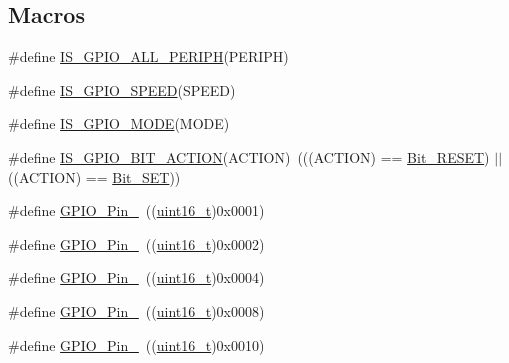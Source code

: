 \subsection*{Macros}
\begin{DoxyCompactItemize}
\item 
\#define \hyperlink{group___g_p_i_o___exported___types_ga68b2a1f0b05c13978217db5439c7f790}{I\+S\+\_\+\+G\+P\+I\+O\+\_\+\+A\+L\+L\+\_\+\+P\+E\+R\+I\+PH}(P\+E\+R\+I\+PH)
\item 
\#define \hyperlink{group___g_p_i_o___exported___types_ga888e1f951df2fe9dbf827528051a3a56}{I\+S\+\_\+\+G\+P\+I\+O\+\_\+\+S\+P\+E\+ED}(S\+P\+E\+ED)
\item 
\#define \hyperlink{group___g_p_i_o___exported___types_gacc5fde3eef57ec3c558c11d0011d900c}{I\+S\+\_\+\+G\+P\+I\+O\+\_\+\+M\+O\+DE}(M\+O\+DE)
\item 
\#define \hyperlink{group___g_p_i_o___exported___types_ga6b882caa8ed9857c5c7267959a7818c5}{I\+S\+\_\+\+G\+P\+I\+O\+\_\+\+B\+I\+T\+\_\+\+A\+C\+T\+I\+ON}(A\+C\+T\+I\+ON)~(((A\+C\+T\+I\+ON) == \hyperlink{group___g_p_i_o___exported___types_ga176130b21c0e719121470a6042d4cf19ae2c026f2b44a949f82a65f3385edef09}{Bit\+\_\+\+R\+E\+S\+ET}) $\vert$$\vert$ ((A\+C\+T\+I\+ON) == \hyperlink{group___g_p_i_o___exported___types_ga176130b21c0e719121470a6042d4cf19a3c477841a6ceec13fe47ef322432b992}{Bit\+\_\+\+S\+ET}))
\item 
\#define \hyperlink{group___g_p_i_o__pins__define_gab305b8d1be9f89bf2b4a05589b456049}{G\+P\+I\+O\+\_\+\+Pin\+\_}~((\hyperlink{_p_e___types_8h_a1f1825b69244eb3ad2c7165ddc99c956}{uint16\+\_\+t})0x0001)
\item 
\#define \hyperlink{group___g_p_i_o__pins__define_ga29db642c26f1fa0fffc3ecadcd30f82b}{G\+P\+I\+O\+\_\+\+Pin\+\_}~((\hyperlink{_p_e___types_8h_a1f1825b69244eb3ad2c7165ddc99c956}{uint16\+\_\+t})0x0002)
\item 
\#define \hyperlink{group___g_p_i_o__pins__define_gabdf6630324b2f99360537a310687187c}{G\+P\+I\+O\+\_\+\+Pin\+\_}~((\hyperlink{_p_e___types_8h_a1f1825b69244eb3ad2c7165ddc99c956}{uint16\+\_\+t})0x0004)
\item 
\#define \hyperlink{group___g_p_i_o__pins__define_ga763c6544859dbe28cd3f8ad820045556}{G\+P\+I\+O\+\_\+\+Pin\+\_}~((\hyperlink{_p_e___types_8h_a1f1825b69244eb3ad2c7165ddc99c956}{uint16\+\_\+t})0x0008)
\item 
\#define \hyperlink{group___g_p_i_o__pins__define_gacbf04d09b954606cdcc55eb2e81780e3}{G\+P\+I\+O\+\_\+\+Pin\+\_}~((\hyperlink{_p_e___types_8h_a1f1825b69244eb3ad2c7165ddc99c956}{uint16\+\_\+t})0x0010)
$$
\end{DoxyCompactItemize}
